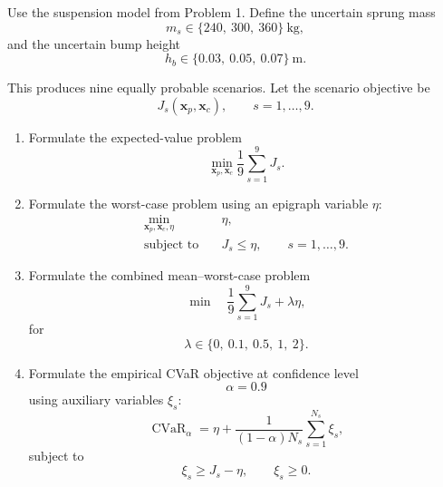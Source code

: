 Use the suspension model from Problem 1. Define the uncertain sprung mass
\begin{equation}
m_s
\in
\{240,\ 300,\ 360\}~\mathrm{kg},
\end{equation}
and the uncertain bump height
\begin{equation}
h_b
\in
\{0.03,\ 0.05,\ 0.07\}~\mathrm{m}.
\end{equation}

This produces nine equally probable scenarios. Let the scenario objective be
\begin{equation}
J_s(\mathbf{x}_p,\mathbf{x}_c),
\qquad
s=1,\ldots,9.
\end{equation}

\begin{enumerate}
    \item Formulate the expected-value problem
    \begin{equation}
    \min_{\mathbf{x}_p,\mathbf{x}_c}
    \frac{1}{9}
    \sum_{s=1}^{9}J_s.
    \end{equation}

    \item Formulate the worst-case problem using an epigraph variable $\eta$:
    \begin{align}
    \min_{\mathbf{x}_p,\mathbf{x}_c,\eta}
    \quad
    & \eta,
    \\
    \text{subject to}
    \quad
    & J_s\leq\eta,
    \qquad
    s=1,\ldots,9.
    \end{align}

    \item Formulate the combined mean--worst-case problem
    \begin{equation}
    \min
    \quad
    \frac{1}{9}
    \sum_{s=1}^{9}J_s
    +
    \lambda\eta,
    \end{equation}
    for
    \begin{equation}
    \lambda
    \in
    \{0,\ 0.1,\ 0.5,\ 1,\ 2\}.
    \end{equation}

    \item Formulate the empirical CVaR objective at confidence level
    \begin{equation}
    \alpha=0.9
    \end{equation}
    using auxiliary variables $\xi_s$:
    \begin{equation}
    \operatorname{CVaR}_{\alpha}
    =
    \eta
    +
    \frac{1}{(1-\alpha)N_s}
    \sum_{s=1}^{N_s}\xi_s,
    \end{equation}
    subject to
    \begin{equation}
    \xi_s\geq J_s-\eta,
    \qquad
    \xi_s\geq0.
    \end{equation}


\end{enumerate}
